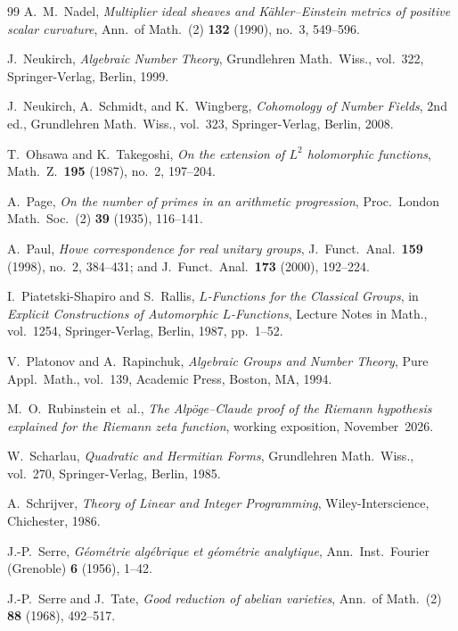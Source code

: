 \begin{thebibliography}{99}
A.~M.~Nadel,
\emph{Multiplier ideal sheaves and K\"ahler--Einstein metrics of positive scalar curvature},
Ann.\ of Math.\ (2) \textbf{132} (1990), no.~3, 549--596.

J.~Neukirch,
\emph{Algebraic Number Theory},
Grundlehren Math.\ Wiss., vol.~322, Springer-Verlag, Berlin, 1999.

J.~Neukirch, A.~Schmidt, and K.~Wingberg,
\emph{Cohomology of Number Fields},
2nd ed., Grundlehren Math.\ Wiss., vol.~323, Springer-Verlag, Berlin, 2008.

T.~Ohsawa and K.~Takegoshi,
\emph{On the extension of $L^2$ holomorphic functions},
Math.\ Z.\ \textbf{195} (1987), no.~2, 197--204.

A.~Page,
\emph{On the number of primes in an arithmetic progression},
Proc.\ London Math.\ Soc.\ (2) \textbf{39} (1935), 116--141.

A.~Paul,
\emph{Howe correspondence for real unitary groups},
J.\ Funct.\ Anal.\ \textbf{159} (1998), no.~2, 384--431; and J.\ Funct.\ Anal.\ \textbf{173} (2000), 192--224.

I.~Piatetski-Shapiro and S.~Rallis,
\emph{$L$-Functions for the Classical Groups},
in \emph{Explicit Constructions of Automorphic $L$-Functions}, Lecture Notes in Math., vol.~1254, Springer-Verlag, Berlin, 1987, pp.~1--52.

V.~Platonov and A.~Rapinchuk,
\emph{Algebraic Groups and Number Theory},
Pure Appl.\ Math., vol.~139, Academic Press, Boston, MA, 1994.

M.~O.~Rubinstein et~al.,
\emph{The Alp\"oge--Claude proof of the Riemann hypothesis explained for the Riemann zeta function},
working exposition, November~2026.

W.~Scharlau,
\emph{Quadratic and Hermitian Forms},
Grundlehren Math.\ Wiss., vol.~270, Springer-Verlag, Berlin, 1985.

A.~Schrijver,
\emph{Theory of Linear and Integer Programming},
Wiley-Interscience, Chichester, 1986.

J.-P.~Serre,
\emph{G\'eom\'etrie alg\'ebrique et g\'eom\'etrie analytique},
Ann.\ Inst.\ Fourier (Grenoble) \textbf{6} (1956), 1--42.

J.-P.~Serre and J.~Tate,
\emph{Good reduction of abelian varieties},
Ann.\ of Math.\ (2) \textbf{88} (1968), 492--517.


\end{thebibliography}
